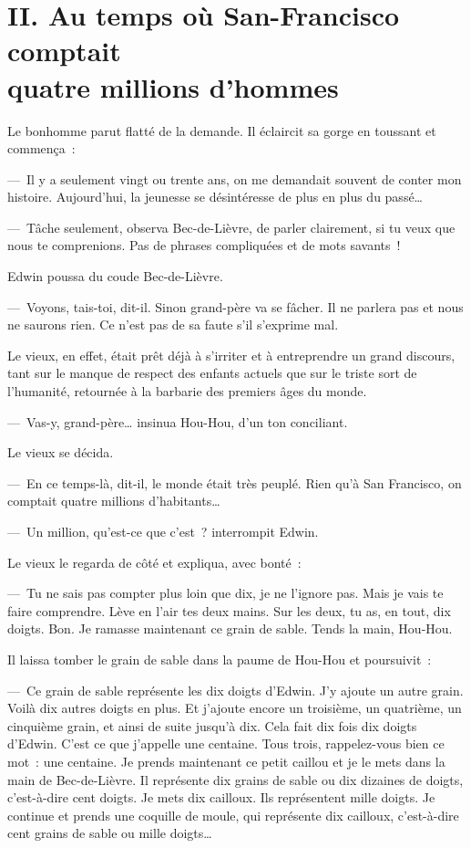 \documentclass[french,twoside]{book} %
\newcommand\chapteropen{} %
\newcommand\chaptercont{} %
\begin{document}
\chapteropen

\chapter[{II. Au temps où San-Francisco comptait, quatre millions d’hommes}]{II. Au temps où San-Francisco comptait \\
quatre millions d’hommes}
\renewcommand{\leftmark}{II. Au temps où San-Francisco comptait \\
quatre millions d’hommes}


\chaptercont
\noindent Le bonhomme parut flatté de la demande. Il éclaircit sa gorge en toussant et commença :\par
— Il y a seulement vingt ou trente ans, on me demandait souvent de conter mon histoire. Aujourd’hui, la jeunesse se désintéresse de plus en plus du passé…\par
— Tâche seulement, observa Bec-de-Lièvre, de parler clairement, si tu veux que nous te comprenions. Pas de phrases compliquées et de mots savants !\par
Edwin poussa du coude Bec-de-Lièvre.\par
— Voyons, tais-toi, dit-il. Sinon grand-père va se fâcher. Il ne parlera pas et nous ne saurons rien. Ce n’est pas de sa faute s’il s’exprime mal.\par
Le vieux, en effet, était prêt déjà à s’irriter et à entreprendre un grand discours, tant sur le manque de respect des enfants actuels que sur le triste sort de l’humanité, retournée à la barbarie des premiers âges du monde.\par
— Vas-y, grand-père… insinua Hou-Hou, d’un ton conciliant.\par
Le vieux se décida.\par
— En ce temps-là, dit-il, le monde était très peuplé. Rien qu’à San Francisco, on comptait quatre millions d’habitants…\par
— Un million, qu’est-ce que c’est ? interrompit Edwin.\par
Le vieux le regarda de côté et expliqua, avec bonté :\par
— Tu ne sais pas compter plus loin que dix, je ne l’ignore pas. Mais je vais te faire comprendre. Lève en l’air tes deux mains. Sur les deux, tu as, en tout, dix doigts. Bon. Je ramasse maintenant ce grain de sable. Tends la main, Hou-Hou.\par
Il laissa tomber le grain de sable dans la paume de Hou-Hou et poursuivit :\par
— Ce grain de sable représente les dix doigts d’Edwin. J’y ajoute un autre grain. Voilà dix autres doigts en plus. Et j’ajoute encore un troisième, un quatrième, un cinquième grain, et ainsi de suite jusqu’à dix. Cela fait dix fois dix doigts d’Edwin. C’est ce que j’appelle une centaine. Tous trois, rappelez-vous bien ce mot : une centaine. Je prends maintenant ce petit caillou et je le mets dans la main de Bec-de-Lièvre. Il représente dix grains de sable ou dix dizaines de doigts, c’est-à-dire cent doigts. Je mets dix cailloux. Ils représentent mille doigts. Je continue et prends une coquille de moule, qui représente dix cailloux, c’est-à-dire cent grains de sable ou mille doigts…\par
\end{document}
